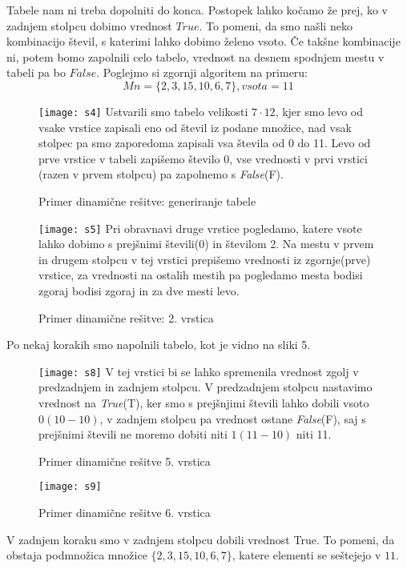 \documentclass[12pt]{article}
\begin{document}
Tabele nam ni treba dopolniti do konca. 
Postopek lahko kočamo že prej, ko v zadnjem stolpcu dobimo vrednost $True$. To pomeni, da smo našli neko 
kombinacijo števil, s katerimi lahko dobimo želeno vsoto. Če takšne kombinacije ni,
potem bomo zapolnili celo tabelo, vrednost na desnem spodnjem mestu v tabeli pa bo $False$.\newline
Poglejmo si zgornji algoritem na primeru:\newline
$$Mn = \{2,3,15,10,6,7\}, vsota = 11$$

\begin{figure}[h]
  \caption{Primer dinamične rešitve: generiranje tabele}  
  \texttt{[image: s4]}
  Ustvarili smo tabelo velikosti $7 \cdot 12$, kjer smo levo od vsake
  vrstice zapisali eno od števil iz podane množice, nad vsak stolpec pa smo 
  zaporedoma zapisali vsa števila od 0 do 11. Levo od prve vrstice v tabeli zapišemo 
  število 0, vse vrednosti v prvi vrstici (razen v prvem stolpcu) pa zapolnemo s \textit{False}(F).
\end{figure}\newpage


\begin{figure}[h]
  \caption{Primer dinamične rešitve: 2. vrstica}  
  \texttt{[image: s5]}
  Pri obravnavi druge vrstice pogledamo, katere vsote lahko dobimo s prejšnimi števili(0) in 
  številom 2. Na mestu v prvem in drugem stolpcu v tej vrstici prepišemo vrednosti iz zgornje(prve) vrstice,
  za vrednosti na ostalih mestih pa pogledamo mesta bodisi zgoraj bodisi zgoraj in za dve mesti levo.
\end{figure}
Po nekaj korakih smo napolnili tabelo, kot je vidno na sliki 5.
\begin{figure}[h]
  \caption{Primer dinamične rešitve 5. vrstica} 
   \texttt{[image: s8]}
   V tej vrstici bi se lahko  spremenila vrednost zgolj v predzadnjem in zadnjem stolpcu.
   V predzadnjem stolpcu nastavimo vrednost na \textit{True}(T), ker smo s prejšnjimi števili 
   lahko dobili vsoto $0 (10-10)$, v zadnjem stolpcu pa vrednost ostane \textit{False}(F), saj s prejšnimi 
   števili ne moremo dobiti niti $1 (11 - 10)$ niti 11.

  \end{figure}

  \begin{figure}[h]
  \caption{Primer dinamične rešitve 6. vrstica}
  \texttt{[image: s9]}
  
\end{figure}
\newpage
V zadnjem koraku smo v zadnjem stolpcu dobili vrednost True. To pomeni,
da obstaja podmnožica množice $\{2,3,15,10,6,7\}$, katere elementi se seštejejo v $11$.
\newpage
\end{document}
